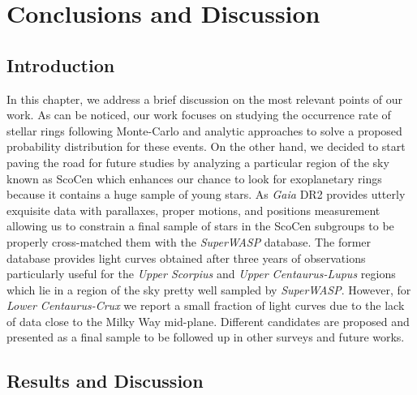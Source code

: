 \chapter{\textbf{Conclusions and Discussion} }\label{ch: Results}

\vspace{0.5cm} 

\section{Introduction}

In this chapter, we address a brief discussion on the most relevant points of our work. As can be noticed, our work focuses on studying the occurrence rate of stellar rings following Monte-Carlo and analytic approaches to solve a proposed probability distribution for these events. On the other hand, we decided to start paving the road for future studies by analyzing a particular region of the sky known as ScoCen which enhances our chance to look for exoplanetary rings because it contains a huge sample of young stars. As \textit{Gaia} DR2 provides utterly exquisite data with parallaxes, proper motions, and positions measurement allowing us to constrain a final sample of stars in the ScoCen subgroups to be properly cross-matched them with the \textit{SuperWASP} database. The former database provides light curves obtained after three years of observations particularly useful for the \textit{Upper Scorpius} and \textit{Upper Centaurus-Lupus} regions which lie in a region of the sky pretty well sampled by \textit{SuperWASP}. However, for \textit{Lower Centaurus-Crux} we report a small fraction of light curves due to the lack of data close to the Milky Way mid-plane. Different candidates are proposed and presented as a final sample to be followed up in other surveys and future works.  

\section{Results and Discussion}

